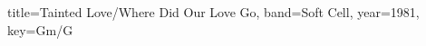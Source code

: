 \documentclass{skrul-leadsheet}
\begin{document}
\newcommand{\lyric}[2]{
\begin{tabular}{|lp{33em}}
\hline
\textbf{#1.} & #2
\end{tabular} \\ }

\begin{song}[transpose-capo=true]{title={Tainted Love/Where Did Our Love Go}, band={Soft Cell}, year={1981}, key={Gm/G}}

\end{song}
\end{document}
